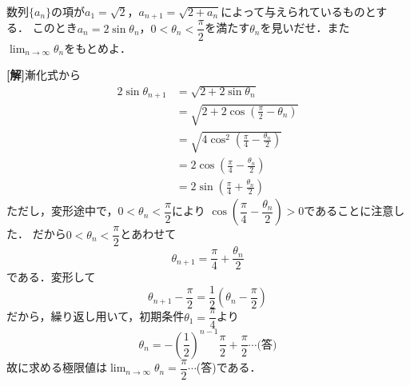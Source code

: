 \documentclass[a4j]{jarticle}
\begin{document}

\begin{oframed}
数列$\{a_n\}$の項が$a_1=\sqrt{2}$，$a_{n+1}=\sqrt{2+a_n}$によって与えられているものとする．
このとき$a_n=2\sin \theta_n$，$0<\theta_n<\dfrac{\pi}{2}$を満たす$\theta_n$を見いだせ．また
$\lim_{n\to\infty}\theta_n$をもとめよ．
\end{oframed}

\setlength{\columnseprule}{0.4pt}
\begin{multicols}{2}
{\bf[解]}漸化式から
     \begin{align*}
     2\sin \theta_{n+1}&=\sqrt{2+2\sin \theta_n} \\
     &=\sqrt{2+2\cos \left(\frac{\pi}{2}-\theta_n\right)} \\
     &=\sqrt{4\cos^2\left(\frac{\pi}{4}-\frac{\theta_n}{2}\right)} \\
     &=2\cos\left(\frac{\pi}{4}-\frac{\theta_n}{2}\right) \\ 
     &=2\sin\left(\frac{\pi}{4}+\frac{\theta_n}{2}\right)
     \end{align*}
ただし，変形途中で，$0<\theta_n<\dfrac{\pi}{2}$により
$\cos\left(\dfrac{\pi}{4}-\dfrac{\theta_n}{2}\right)>0$であることに注意した．
だから$0<\theta_n<\dfrac{\pi}{2}$とあわせて
\[\theta_{n+1}=\frac{\pi}{4}+\frac{\theta_n}{2}\]
である．変形して
\[\theta_{n+1}-\frac{\pi}{2}=\frac{1}{2}\left(\theta_n-\frac{\pi}{2}\right) \]
だから，繰り返し用いて，初期条件$\theta_1=\dfrac{\pi}{4}$より
\[\theta_n=-\left(\frac{1}{2}\right)^{n-1}\frac{\pi}{2}+\frac{\pi}{2} \cdots\text{(答)}　\]
故に求める極限値は$\lim_{n\to\infty}\theta_n=\dfrac{\pi}{2}\cdots$(答)である．


   

\newpage
\end{multicols}
\end{document}
